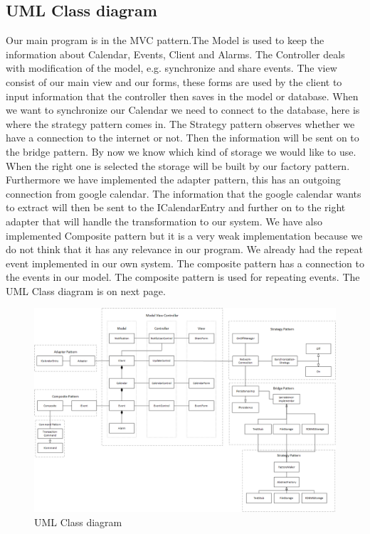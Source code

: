 \subsection*{UML Class diagram}
Our main program is in the MVC pattern.The Model is used to keep the information about Calendar, Events, Client and Alarms. The Controller deals with modification of the model, e.g. synchronize and share events. The view consist of our main view and our forms, these forms are used by the client to input information that the controller then saves in the model or database.
When we want to synchronize our Calendar we need to connect to the database, here is where the strategy pattern comes in. The Strategy pattern observes whether we have a connection to the internet or not. Then the information will be sent on to the bridge pattern. By now we know which kind of storage we would like to use. When the right one is selected the storage will be built by our factory pattern. 
Furthermore we have implemented the adapter pattern, this has an outgoing connection from google calendar. The information that the google calendar wants to extract will then be sent to the ICalendarEntry and further on to the right adapter that will handle the transformation to our system. 
We have also implemented Composite pattern but it is a very weak implementation because we do not think that it has any relevance in our program. We already had the repeat event implemented in our own system. The composite pattern has a connection to the events in our model. The composite pattern is used for repeating events.
\newline
The UML Class diagram is on next page.

\begin{figure}
\centering
\includegraphics[width=210mm]{class.png}
\caption{UML Class diagram \label{overflow}}
\end{figure}


